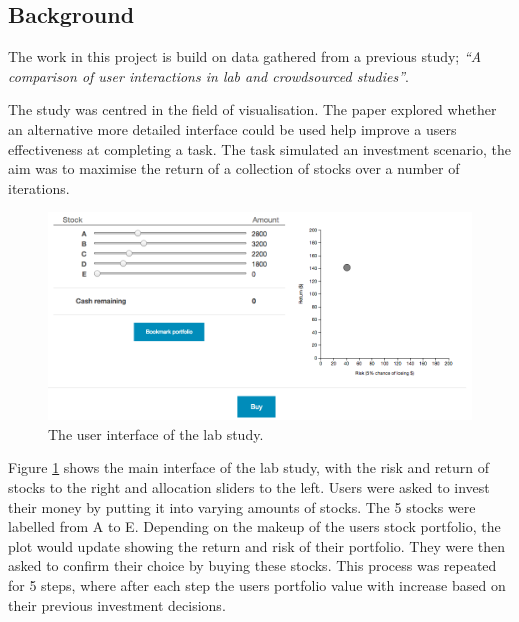 \documentclass{article}
\begin{document}
\subsection{Background}


The work in this project is build on data gathered from a previous study;
\textit{``A comparison of user interactions in lab and crowdsourced
studies''}\cite{gruber2017thesis}.

The study was centred in the field of visualisation.
The paper explored whether an alternative more detailed interface could be used help improve a users effectiveness at completing a task.
The task simulated an investment scenario, the aim was to maximise the return of a collection of stocks over a number of iterations. 

\begin{figure}[ht]
    \centering
    \includegraphics[scale=0.3, frame]{Images/interface.png}
    \caption{The user interface of the lab study.}
    \label{fig:interface}
\end{figure}

Figure \ref{fig:interface} shows the main interface of the lab study, with the risk and return of stocks to the right and allocation sliders to the left.
Users were asked to invest their money by putting it into varying amounts of stocks.
The 5 stocks were labelled from A to E.
Depending on the makeup of the users stock portfolio, the plot would update showing the return and risk of their portfolio.
They were then asked to confirm their choice by buying these stocks.
This process was repeated for 5 steps, where after each step the users portfolio value with increase based on their previous investment decisions. 
\end{document}

